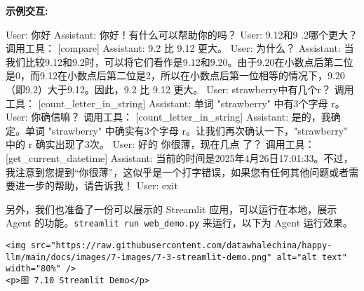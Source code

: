 \documentclass[
]{article}
\newenvironment{Shaded}{}{}
\newcommand{\ExtensionTok}[1]{#1}
\newcommand{\NormalTok}[1]{#1}
\newcommand{\PreprocessorTok}[1]{\textcolor[rgb]{0.74,0.48,0.00}{#1}}
\newcommand{\StringTok}[1]{\textcolor[rgb]{0.25,0.44,0.63}{#1}}
\begin{document}
\textbf{示例交互:}

\begin{Shaded}
\begin{Highlighting}[]
\ExtensionTok{User:}\NormalTok{ 你好}
\ExtensionTok{Assistant:}\NormalTok{  你好！有什么可以帮助你的吗？}
\ExtensionTok{User:}\NormalTok{ 9.12和9 .2哪个更大？}
\ExtensionTok{调用工具：} \PreprocessorTok{[}\StringTok{\textquotesingle{}compare\textquotesingle{}}\PreprocessorTok{]}
\ExtensionTok{Assistant:}\NormalTok{  9.2 比 9.12 更大。}
\ExtensionTok{User:}\NormalTok{ 为什么？}
\ExtensionTok{Assistant:}\NormalTok{  当我们比较9.12和9.2时，可以将它们看作是9.12和9.20。由于9.20在小数点后第二位是0，而9.12在小数点后第二位是2，所以在小数点后第一位相等的情况下，9.20（即9.2）大于9.12。因此，9.2 比 9.12 更大。}
\ExtensionTok{User:}\NormalTok{ strawberry中有几个r？}
\ExtensionTok{调用工具：} \PreprocessorTok{[}\StringTok{\textquotesingle{}count\_letter\_in\_string\textquotesingle{}}\PreprocessorTok{]}
\ExtensionTok{Assistant:}\NormalTok{  单词 }\StringTok{"strawberry"}\NormalTok{ 中有3个字母 }\StringTok{\textquotesingle{}r\textquotesingle{}}\NormalTok{。}
\ExtensionTok{User:}\NormalTok{ 你确信嘛？}
\ExtensionTok{调用工具：} \PreprocessorTok{[}\StringTok{\textquotesingle{}count\_letter\_in\_string\textquotesingle{}}\PreprocessorTok{]}
\ExtensionTok{Assistant:}\NormalTok{  是的，我确定。单词 }\StringTok{"strawberry"}\NormalTok{ 中确实有3个字母 }\StringTok{\textquotesingle{}r\textquotesingle{}}\NormalTok{。让我们再次确认一下，}\StringTok{"strawberry"}\NormalTok{ 中的 }\StringTok{\textquotesingle{}r\textquotesingle{}}\NormalTok{ 确实出现了3次。}
\ExtensionTok{User:}\NormalTok{ 好的 你很薄，现在几点 了？}
\ExtensionTok{调用工具：} \PreprocessorTok{[}\StringTok{\textquotesingle{}get\_current\_datetime\textquotesingle{}}\PreprocessorTok{]}
\ExtensionTok{Assistant:}\NormalTok{  当前的时间是2025年4月26日17:01:33。不过，我注意到您提到“你很薄”，这似乎是一个打字错误，如果您有任何其他问题或者需要进一步的帮助，请告诉我！}
\ExtensionTok{User:}\NormalTok{ exit}
\end{Highlighting}
\end{Shaded}

另外，我们也准备了一份可以展示的 Streamlit 应用，可以运行在本地，展示
Agent 的功能。\texttt{streamlit\ run\ web\_demo.py} 来运行，以下为 Agent
运行效果。

\begin{verbatim}
<img src="https://raw.githubusercontent.com/datawhalechina/happy-llm/main/docs/images/7-images/7-3-streamlit-demo.png" alt="alt text" width="80%" />
<p>图 7.10 Streamlit Demo</p>
\end{verbatim}
\end{document}
